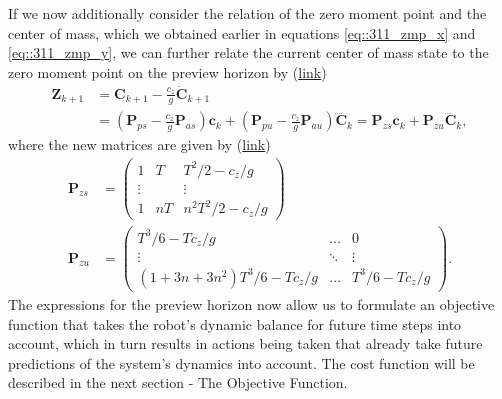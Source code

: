 If we now additionally consider the relation of the zero moment point and the center of mass, which we obtained earlier in equations \ref{eq::311_zmp_x} and \ref{eq::311_zmp_y}, we can further relate the current center of mass state to the zero moment point on the preview horizon by (\href{https://github.com/mhubii/nmpc_pattern_generator/blob/5a213044c927dc6aac9f7e32ce1e5fb472cd67bb/libs/pattern_generator/include/pattern_generator/base_generator.h#L219}{link})
\begin{align}
	\bm{Z}_{k+1} &= \bm{C}_{k+1} - \frac{c_z}{g}\ddot{\bm{C}}_{k+1} \\
	&= \left(\bm{P}_{ps}-\frac{c_z}{g}\bm{P}_{as}\right)\bm{c}_k + \left(\bm{P}_{pu}-\frac{c_z}{g}\bm{P}_{au}\right)\ddddot{\bm{C}}_k = \bm{P}_{zs} \bm{c}_k + \bm{P}_{zu}\dddot{\bm{C}}_k,
	\label{eq::312_zmp}
\end{align}
where the new matrices are given by (\href{https://github.com/mhubii/nmpc_pattern_generator/blob/5a213044c927dc6aac9f7e32ce1e5fb472cd67bb/libs/pattern_generator/src/base_generator.cpp#L420}{link})
\begin{align}
	\bm{P}_{zs} &= \begin{pmatrix}
	1 & T & T^2/2 - c_z/g \\
	\vdots & & \vdots \\
	1 & nT & n^2T^2/2 - c_z/g
	\end{pmatrix} \\ 
	\bm{P}_{zu} &= \begin{pmatrix}
	T^3/6 - Tc_z/g & \dots & 0 \\
	\vdots & \ddots & \vdots \\
	(1+3n+3n^2)T^3/6 - Tc_z/g & \dots & T^3/6-Tc_z/g
	\end{pmatrix}.
\end{align}
The expressions for the preview horizon now allow us to formulate an objective function that takes the robot's dynamic balance for future time steps into account, which in turn results in actions being taken that already take future predictions of the system's dynamics into account. The cost function will be described in the next section - The Objective Function.
